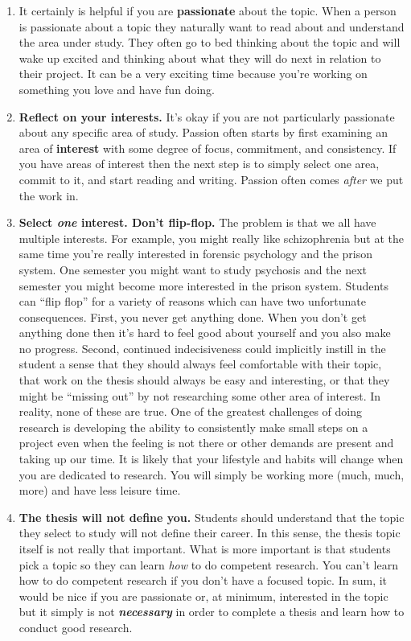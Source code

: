 \documentclass[
  openany]{book}
\begin{document}
\begin{enumerate}
\def\labelenumi{\arabic{enumi}.}
\item
  It certainly is helpful if you are \textbf{passionate} about the topic. When a person is passionate about a topic they naturally want to read about and understand the area under study. They often go to bed thinking about the topic and will wake up excited and thinking about what they will do next in relation to their project. It can be a very exciting time because you're working on something you love and have fun doing.
\item
  \textbf{Reflect on your interests.} It's okay if you are not particularly passionate about any specific area of study. Passion often starts by first examining an area of \textbf{interest} with some degree of focus, commitment, and consistency. If you have areas of interest then the next step is to simply select one area, commit to it, and start reading and writing. Passion often comes \emph{after} we put the work in.
\item
  \textbf{Select \emph{one} interest. Don't flip-flop.} The problem is that we all have multiple interests. For example, you might really like schizophrenia but at the same time you're really interested in forensic psychology and the prison system. One semester you might want to study psychosis and the next semester you might become more interested in the prison system. Students can ``flip flop'' for a variety of reasons which can have two unfortunate consequences. First, you never get anything done. When you don't get anything done then it's hard to feel good about yourself and you also make no progress. Second, continued indecisiveness could implicitly instill in the student a sense that they should always feel comfortable with their topic, that work on the thesis should always be easy and interesting, or that they might be ``missing out'' by not researching some other area of interest. In reality, none of these are true. One of the greatest challenges of doing research is developing the ability to consistently make small steps on a project even when the feeling is not there or other demands are present and taking up our time. It is likely that your lifestyle and habits will change when you are dedicated to research. You will simply be working more (much, much, more) and have less leisure time.
\item
  \textbf{The thesis will not define you.} Students should understand that the topic they select to study will not define their career. In this sense, the thesis topic itself is not really that important. What is more important is that students pick a topic so they can learn \emph{how} to do competent research. You can't learn how to do competent research if you don't have a focused topic. In sum, it would be nice if you are passionate or, at minimum, interested in the topic but it simply is not \textbf{\emph{necessary}} in order to complete a thesis and learn how to conduct good research.

\end{enumerate}
\end{document}
